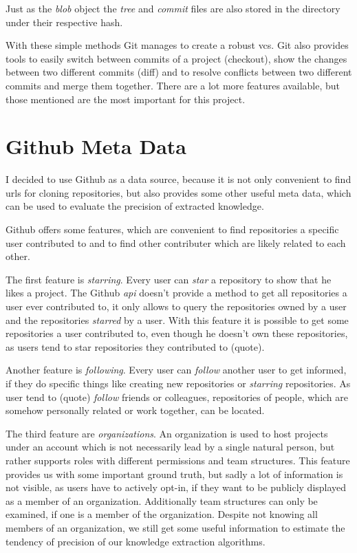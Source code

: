 Just as the \emph{blob} object the \emph{tree} and \emph{commit} files are also stored in the  directory under their respective hash.

With these simple methods Git manages to create a robust \ac{vcs}.
Git also provides tools to easily switch between commits of a project (checkout), show the changes between two different commits (diff) and to resolve conflicts between two different commits and merge them together.
There are a lot more features available, but those mentioned are the most important for this project.

\section{Github Meta Data}\label{github-meta-data}

I decided to use Github as a data source, because it is not only convenient to find \acp{url} for cloning repositories, but also provides some other useful meta data, which can be used to evaluate the precision of extracted knowledge.

Github offers some features, which are convenient to find repositories a specific user contributed to and to find other contributer which are likely related to each other.

The first feature is \emph{starring}. Every user can \emph{star} a repository to show that he likes a project.
The Github \emph{api} doesn't provide a method to get all repositories a user ever contributed to, it only allows to query the repositories owned by a user and the repositories \emph{starred} by a user.
With this feature it is possible to get some repositories a user contributed to, even though he doesn't own these repositories, as users tend to star repositories they contributed to (quote).

Another feature is \emph{following}. Every user can \emph{follow} another user to get informed, if they do specific things like creating new repositories or \emph{starring} repositories.
As user tend to (quote) \emph{follow} friends or colleagues, repositories of people, which are somehow personally related or work together, can be located.

The third feature are \emph{organizations}.
An organization is used to host projects under an account which is not necessarily lead by a single natural person, but rather supports roles with different permissions and team structures.
This feature provides us with some important ground truth, but sadly a lot of information is not visible, as users have to actively opt-in, if they want to be publicly displayed as a member of an organization.
Additionally team structures can only be examined, if one is a member of the organization.
Despite not knowing all members of an organization, we still get some useful information to estimate the tendency of precision of our knowledge extraction algorithms.



